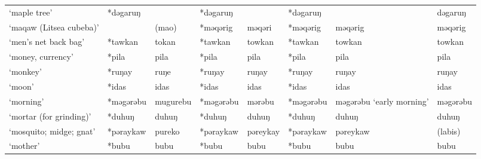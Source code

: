 \begin{landscape}
\begin{longtable}[c]{@{}p{3cm}<{\raggedright}p{2.75cm}<{\raggedright}p{2.75cm}<{\raggedright}p{2.75cm}<{\raggedright}p{2.75cm}<{\raggedright}p{2.75cm}<{\raggedright}p{2.75cm}<{\raggedright}p{2.75cm}<{\raggedright}@{}}
`maple tree'                                         & *dəgaruŋ           &                                & *dəgaruŋ           &                            & *dəgaruŋ         &                          & dəgaruŋ                           \\
`maqaw (Litsea cubeba)'                              &            & (mao)                          & *məqərig           & məqəri                     & *məqərig         & məqərig                  & məqərig                           \\
`men's net back bag'                                 & *tawkan            & tokan                          & *tawkan            & towkan                     & *tawkan          & towkan                   & towkan                            \\
`money, currency'                                    & *pila              & pila                           & *pila              & pila                       & *pila            & pila                     & pila                              \\
`monkey'                                             & *ruŋay             & ruŋe                           & *ruŋay             & ruŋay                      & *ruŋay           & ruŋay                    & ruŋay                             \\
`moon'                                               & *idas              & idas                           & *idas              & idas                       & *idas            & idas                     & idas                              \\
`morning'                                            & *məgərəbu          & mugurebu                       & *məgərəbu          & mərəbu                     & *məgərəbu        & məgərəbu `early morning' & məgərəbu                          \\
`mortar (for grinding)'                              & *duhuŋ             & duhuŋ                          & *duhuŋ             & duhuŋ                      & *duhuŋ           & duhuŋ                    & duhuŋ                             \\
`mosquito; midge; gnat'                              & *pəraykaw          & pureko                         & *pəraykaw          & pəreykay                   & *pəraykaw        & pəreykaw                 & (labis)                           \\
`mother'                                             & *bubu              & bubu                           & *bubu              & bubu                       & *bubu            & bubu                     & bubu                              \\

\end{longtable}
\end{landscape}
